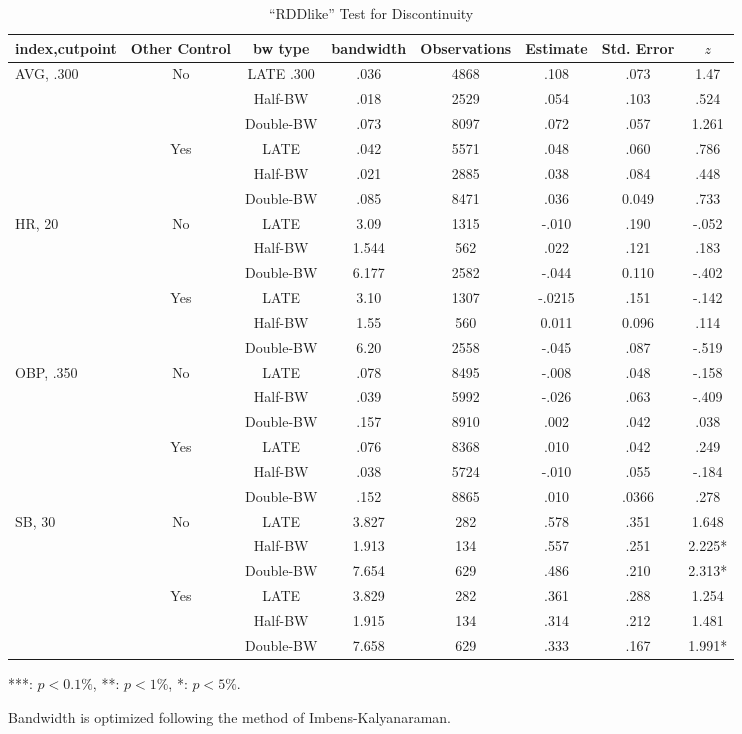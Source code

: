 \documentclass[dvipdfmx, 12pt]{article}
\begin{document}
\begin{landscape}
  \begin{table}[!]
    \small
    \centering
    \begin{tabular}{lccccccc}\hline
      index,cutpoint & Other Control & bw type & bandwidth
      & Observations & Estimate & Std. Error & $z$
      \\ \hline \hline
      AVG, .300 & No &LATE .300 & .036 & 4868 & .108 & .073 & 1.47 \\
      & &Half-BW &  .018 & 2529 & .054 & .103 & .524 \\
      & & Double-BW & .073 & 8097 & .072 & .057 & 1.261
      \\ \cline{3-8}
      & Yes & LATE & .042 & 5571 & .048 & .060 & .786 \\
      & & Half-BW & .021 & 2885 & .038 & .084 & .448 \\
      & & Double-BW & .085 & 8471 & .036 & 0.049 & .733
      \\ \hline
      HR, 20 & No & LATE & 3.09 & 1315 & -.010 & .190 & -.052 \\
      & & Half-BW & 1.544 & 562 & .022 & .121 & .183 \\
      & & Double-BW & 6.177 & 2582 & -.044 & 0.110 & -.402 \\ \cline{3-8}
      & Yes & LATE & 3.10& 1307 & -.0215 & .151 & -.142 \\
      & & Half-BW & 1.55 & 560 & 0.011 & 0.096 & .114 \\
      & & Double-BW & 6.20 & 2558 & -.045 & .087 & -.519 \\ \hline
      OBP, .350 & No &LATE & .078 & 8495 & -.008 & .048 & -.158 \\
      & & Half-BW & .039 & 5992 & -.026 & .063 & -.409 \\
      & & Double-BW & .157 & 8910 & .002 & .042 & .038 \\ \cline{3-8}
      & Yes & LATE & .076 & 8368 & .010 & .042 & .249 \\
      & & Half-BW & .038 & 5724 & -.010 & .055 & -.184 \\
      & &Double-BW & .152 & 8865 & .010 & .0366 & .278 \\ \hline
      SB, 30 & No & LATE & 3.827 & 282 & .578 & .351 & 1.648 \\
      & &Half-BW & 1.913 & 134 & .557 & .251 & 2.225* \\
      & &Double-BW & 7.654 & 629 & .486 & .210 & 2.313* \\ \cline{3-8}
      & Yes & LATE & 3.829 & 282 & .361 & .288 & 1.254 \\
      & & Half-BW & 1.915 & 134 & .314 & .212 & 1.481 \\
      & & Double-BW & 7.658 & 629 & .333 & .167 & 1.991* \\ \hline
    \end{tabular}
    \footnotesize
    \flushright
    ***: $p<0.1\%$, **: $p<1\%$, *: $p<5\%$.

    Bandwidth is optimized following the method of
    Imbens-Kalyanaraman.
    \caption{``RDDlike'' Test for Discontinuity}
  \end{table}
\end{landscape}
\end{document}
